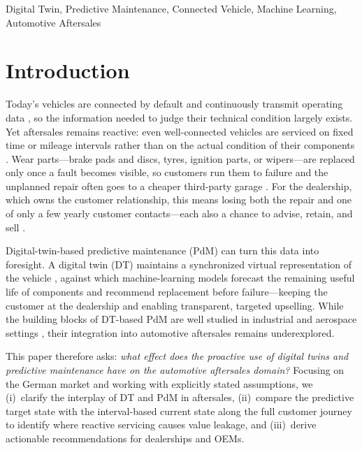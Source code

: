 \documentclass[conference,a4paper]{IEEEtran}
\begin{document}
\begin{IEEEkeywords}
Digital Twin, Predictive Maintenance, Connected Vehicle, Machine Learning, Automotive Aftersales
\end{IEEEkeywords}


\section{Introduction}

Today's vehicles are connected by default and continuously transmit operating
data \cite{lopes2025vehicledt,coppola2016connected}, so the information needed
to judge their technical condition largely exists. Yet aftersales remains
reactive: even well-connected vehicles are serviced on fixed time or mileage
intervals rather than on the actual condition of their components \cite{national_transport_university_overview_2023}.
Wear parts---brake pads and discs, tyres, ignition parts, or wipers---are replaced
only once a fault becomes visible, so customers run them to failure and the
unplanned repair often goes to a cheaper third-party garage \cite{alexander_secret_2002}. For the
dealership, which owns the customer relationship, this means losing both the
repair and one of only a few yearly customer contacts---each also a chance to
advise, retain, and sell \cite{challagalla_proactive_2009,sabbagha_impact_2016}.

Digital-twin-based predictive maintenance (PdM) can turn this data into
foresight. A digital twin (DT) maintains a synchronized virtual representation of
the vehicle \cite{grieves2014}, against which machine-learning models forecast
the remaining useful life of components and recommend replacement before
failure---keeping the customer at the dealership and enabling transparent,
targeted upselling. While the building blocks of DT-based PdM are well studied
in industrial and aerospace settings \cite{wang2023review,abougrad2026xai},
their integration into automotive aftersales remains underexplored.

This paper therefore asks: \emph{what effect does the proactive use of digital
twins and predictive maintenance have on the automotive aftersales domain?}
Focusing on the German market and working with explicitly stated assumptions,
we (i)~clarify the interplay of DT and PdM in aftersales, (ii)~compare the predictive target state with the interval-based current state along the full customer journey to identify where reactive servicing causes value leakage, and (iii)~derive actionable recommendations for dealerships and OEMs.
\end{document}
